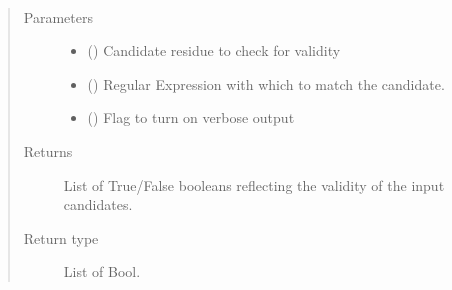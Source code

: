 \documentclass[letterpaper,10pt,english]{sphinxmanual}
\begin{document}
\begin{fulllineitems}
\label{\detokenize{functions:pyresid.check_residue_candidate_validity}}~\begin{quote}\begin{description}
\item[{Parameters}] \leavevmode\begin{itemize}
\item {} 
 () \textendash{} Candidate residue to check for validity

\item {} 
 (\sphinxstyleliteralemphasis{\sphinxupquote{, }}\sphinxstyleliteralemphasis{\sphinxupquote{, }}\sphinxstyleliteralemphasis{\sphinxupquote{{[}}}\sphinxstyleliteralemphasis{\sphinxupquote{{]}}}\sphinxstyleliteralemphasis{\sphinxupquote{{[}}}\sphinxstyleliteralemphasis{\sphinxupquote{{]}}}) \textendash{} Regular Expression with which to match the candidate.

\item {} 
 (\sphinxstyleliteralemphasis{\sphinxupquote{, }}\sphinxstyleliteralemphasis{\sphinxupquote{, }}) \textendash{} Flag to turn on verbose output

\end{itemize}

\item[{Returns}] \leavevmode
{} \textendash{} List of True/False booleans reflecting the validity of the input candidates.

\item[{Return type}] \leavevmode
List of Bool.

\end{description}\end{quote}

\end{fulllineitems}
\end{document}
